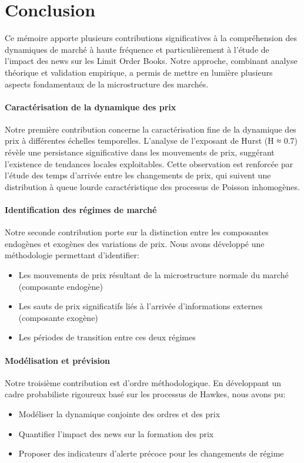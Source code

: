 \documentclass[12pt,a4paper]{article}
\theoremstyle{definition}
\theoremstyle{remark}
\begin{document}
\section*{Conclusion}

Ce mémoire apporte plusieurs contributions significatives à la compréhension des dynamiques de marché à haute fréquence et particulièrement à l'étude de l'impact des news sur les Limit Order Books. Notre approche, combinant analyse théorique et validation empirique, a permis de mettre en lumière plusieurs aspects fondamentaux de la microstructure des marchés.

\paragraph{\textbf{Caractérisation de la dynamique des prix}} Notre première contribution concerne la caractérisation fine de la dynamique des prix à différentes échelles temporelles. L'analyse de l'exposant de Hurst (H ≈ 0.7) révèle une persistance significative dans les mouvements de prix, suggérant l'existence de tendances locales exploitables. Cette observation est renforcée par l'étude des temps d'arrivée entre les changements de prix, qui suivent une distribution à queue lourde caractéristique des processus de Poisson inhomogènes.

\paragraph{\textbf{Identification des régimes de marché}} Notre seconde contribution porte sur la distinction entre les composantes endogènes et exogènes des variations de prix. Nous avons développé une méthodologie permettant d'identifier:
\begin{itemize}
    \item Les mouvements de prix résultant de la microstructure normale du marché (composante endogène)
    \item Les sauts de prix significatifs liés à l'arrivée d'informations externes (composante exogène)
    \item Les périodes de transition entre ces deux régimes
\end{itemize}

\paragraph{\textbf{Modélisation et prévision}} Notre troisième contribution est d'ordre méthodologique. En développant un cadre probabiliste rigoureux basé sur les processus de Hawkes, nous avons pu:
\begin{itemize}
    \item Modéliser la dynamique conjointe des ordres et des prix
    \item Quantifier l'impact des news sur la formation des prix
    \item Proposer des indicateurs d'alerte précoce pour les changements de régime
\end{itemize}
\end{document}

